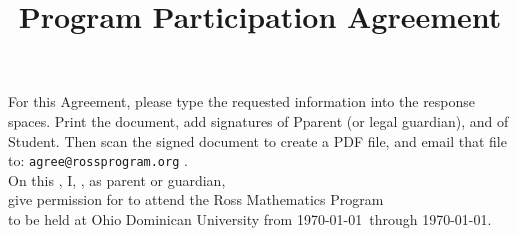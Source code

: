 \documentclass{ross}
\title{Program Participation Agreement}
\begin{document}
\maketitle
For this Agreement, please type the requested information into the response spaces.
Print the document, add signatures of Pparent (or legal guardian), and of Student.  
Then scan the signed document to create a PDF file, and email that file
to: \texttt{agree@rossprogram.org} . \\

On this , I, , as parent or guardian, \\[5pt]
 give permission for  to attend the Ross Mathematics Program \\[5pt]
 to be held at Ohio Dominican University from \startsunday\today\ through
\finishfriday\today.
\end{document}
